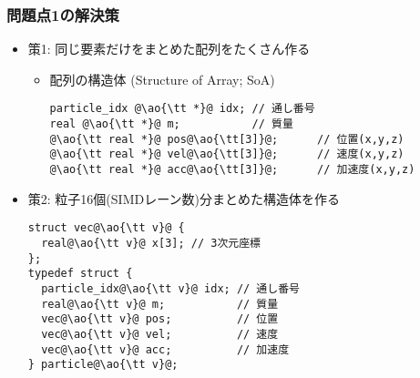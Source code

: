 \documentclass[10pt,dvipdfmx]{beamer}
\newcommand{\ao}[1]{{\color{blue}#1}}
\begin{document}
\begin{frame}[fragile]
  \frametitle{問題点1の解決策}
  \begin{itemize}
  \item 策1: 同じ要素だけをまとめた配列をたくさん作る
    \begin{itemize}
    \item 配列の構造体 (Structure of Array; SoA)
      \begin{lstlisting}
particle_idx @\ao{\tt *}@ idx; // 通し番号
real @\ao{\tt *}@ m;           // 質量
@\ao{\tt real *}@ pos@\ao{\tt[3]}@;      // 位置(x,y,z)
@\ao{\tt real *}@ vel@\ao{\tt[3]}@;      // 速度(x,y,z)
@\ao{\tt real *}@ acc@\ao{\tt[3]}@;      // 加速度(x,y,z)
\end{lstlisting}
    \end{itemize}
  \item 策2: 粒子16個(SIMDレーン数)分まとめた構造体を作る
    \begin{lstlisting}
struct vec@\ao{\tt v}@ {
  real@\ao{\tt v}@ x[3]; // 3次元座標
};
typedef struct {
  particle_idx@\ao{\tt v}@ idx; // 通し番号
  real@\ao{\tt v}@ m;           // 質量
  vec@\ao{\tt v}@ pos;          // 位置
  vec@\ao{\tt v}@ vel;          // 速度
  vec@\ao{\tt v}@ acc;          // 加速度
} particle@\ao{\tt v}@;
\end{lstlisting}
  \end{itemize}
\end{frame}
\end{document}
